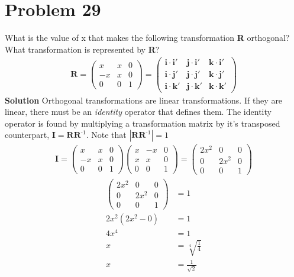 \documentclass[]{article}
\newcommand{\bd}{\textbf}
\newcommand{\ih}{\bd{i}}
\newcommand{\jh}{\bd{j}}
\newcommand{\kh}{\bd{k}}
\begin{document}
\section{Problem 29}
What is the value of x that makes the following transformation \bd{R} orthogonal? What transformation is represented by \bd{R}?
\begin{equation}
\begin{split}
\bd{R} =
\begin{pmatrix}
x&x&0\\
-x&x&0\\
0&0&1
\end{pmatrix}
=
\begin{pmatrix}
\ih \cdot \ih'&\jh \cdot \ih'&\kh \cdot \ih'\\
\ih \cdot \jh'&\jh \cdot \jh'&\kh \cdot \jh'\\
\ih \cdot \kh'&\jh \cdot \kh'&\kh \cdot \kh'
\end{pmatrix}
\end{split}
\end{equation}
\bd{Solution} Orthogonal transformations are linear transformations. If they are linear, there must be an \textit{identity} operator that defines them. The identity operator is found by multiplying a transformation matrix by it's transposed counterpart, $ \bd{I} = \bd{R} \bd{R}^\text{-1} $. Note that $ \left\lvert \bd{R} \bd{R}^\text{-1} \right\rvert = 1 $
\begin{equation}
\begin{split}
\bd{I} =
\begin{pmatrix}
x&x&0\\
-x&x&0\\
0&0&1
\end{pmatrix}
\begin{pmatrix}
x&-x&0\\
x&x&0\\
0&0&1
\end{pmatrix}
=
\begin{pmatrix}
2x^2&0&0\\
0&2x^2&0\\
0&0&1
\end{pmatrix}
\end{split}
\end{equation}
\begin{equation}
\begin{split}
\begin{pmatrix}
2x^2&0&0\\
0&2x^2&0\\
0&0&1
\end{pmatrix}
&= 1 \\
2x^2(2x^2 - 0) &= 1 \\
4x^4 &= 1 \\
x &= \sqrt[4]{\frac{1}{4}} \\
x &= \frac{1}{\sqrt{2}}
\end{split}
\end{equation}
\end{document}

